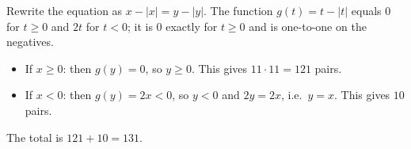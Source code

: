 Rewrite the equation as $x-|x|=y-|y|$. The function $g(t)=t-|t|$ equals $0$ for $t\ge0$ and $2t$ for $t<0$; it is $0$ exactly for $t\ge0$ and is one-to-one on the negatives.
\begin{itemize}
\item If $x\ge0$: then $g(y)=0$, so $y\ge0$. This gives $11\cdot11=121$ pairs.
\item If $x<0$: then $g(y)=2x<0$, so $y<0$ and $2y=2x$, i.e.\ $y=x$. This gives $10$ pairs.
\end{itemize}
The total is $121+10=\boxed{131}$.
